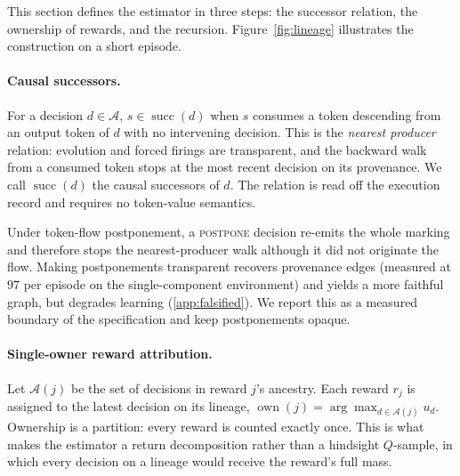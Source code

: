 \documentclass[review,authoryear,3p,times]{elsarticle}
\newcommand{\Ascr}{\mathcal{A}}
\newcommand{\suc}{\operatorname{succ}}
\newcommand{\own}{\operatorname{own}}
\begin{document}


This section defines the estimator in three steps: the successor relation, the
ownership of rewards, and the recursion. Figure~\ref{fig:lineage} illustrates
the construction on a short episode.

\paragraph{Causal successors.} For a decision $d\in\Ascr$, $s\in\suc(d)$ when
$s$ consumes a token descending from an output token of $d$ with no
intervening decision. This is the \emph{nearest producer} relation: evolution
and forced firings are transparent, and the backward walk from a consumed token
stops at the most recent decision on its provenance. We call $\suc(d)$ the
causal successors of $d$. The relation is read off the execution record and
requires no token-value semantics.

Under token-flow postponement, a \textsc{postpone} decision re-emits the whole
marking and therefore stops the nearest-producer walk although it did not
originate the flow. Making postponements transparent recovers provenance edges
(measured at $97$ per episode on the single-component environment) and yields
a more faithful graph, but degrades learning (\ref{app:falsified}). We report
this as a measured boundary of the specification and keep postponements
opaque.

\paragraph{Single-owner reward attribution.} Let $\Ascr(j)$ be the set of
decisions in reward $j$'s ancestry. Each reward $r_j$ is assigned to the latest
decision on its lineage, $\own(j)=\arg\max_{d\in\Ascr(j)}u_d$. Ownership is a partition:
every reward is counted exactly once. This is what makes the estimator a return
decomposition rather than a hindsight $Q$-sample, in which every decision on a
lineage would receive the reward's full mass.
\end{document}
